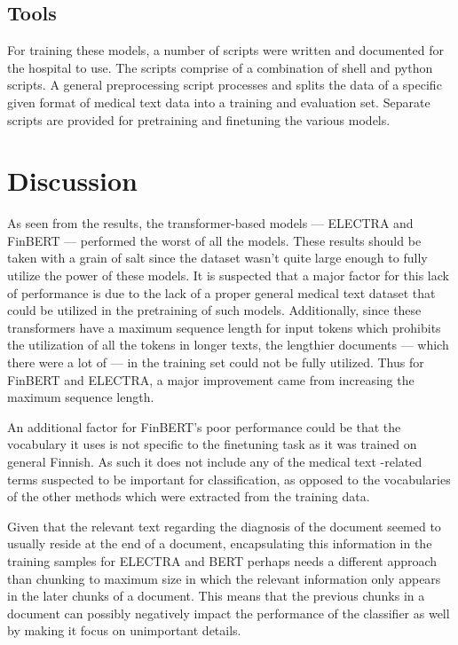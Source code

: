 \subsection{Tools}\label{Tools}
For training these models, a number of scripts were written and documented for the hospital to use.
The scripts comprise of a combination of shell and python scripts.
A general preprocessing script processes and splits the data of a specific given format of medical text data into a training and evaluation set.
Separate scripts are provided for pretraining and finetuning the various models.


\section{Discussion}\label{Discussion}
As seen from the results, the transformer-based models --- ELECTRA and FinBERT --- performed the worst of all the models.
These results should be taken with a grain of salt since the dataset wasn't quite large enough to fully utilize the power of these models.
It is suspected that a major factor for this lack of performance is due to the lack of a proper general medical text dataset that could be utilized in the pretraining of such models.
Additionally, since these transformers have a maximum sequence length for input tokens which prohibits the utilization of all the tokens in longer texts, the lengthier documents --- which there were a lot of --- in the training set could not be fully utilized.
Thus for FinBERT and ELECTRA, a major improvement came from increasing the maximum sequence length.


An additional factor for FinBERT's poor performance could be that the vocabulary it uses is not specific to the finetuning task as it was trained on general Finnish.
As such it does not include any of the medical text -related terms suspected to be important for classification, as opposed to the vocabularies of the other methods which were extracted from the training data.


Given that the relevant text regarding the diagnosis of the document seemed to usually reside at the end of a document, encapsulating this information in the training samples for ELECTRA and BERT perhaps needs a different approach than chunking to maximum size in which the relevant information only appears in the later chunks of a document.
This means that the previous chunks in a document can possibly negatively impact the performance of the classifier as well by making it focus on unimportant details.


